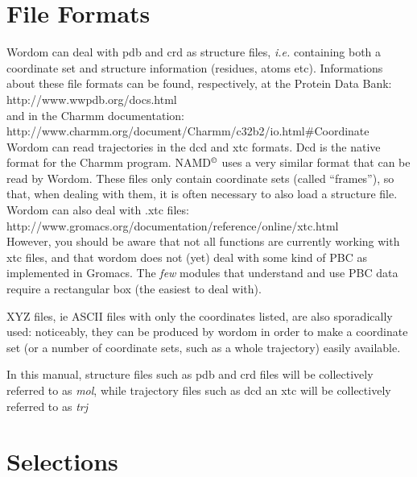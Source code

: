 \documentclass[11pt,twoside,onecolumn,a4paper,openright,notitlepage]{book}[2001/04/21]
\begin{document}
\section{File Formats}
Wordom can deal with pdb and crd as structure files, \emph{i.e.} containing both a coordinate set and structure information (residues, atoms etc). Informations about these file formats can be found, respectively, at the Protein Data Bank:\\ http://www.wwpdb.org/docs.html\\
and in the Charmm documentation:\\ http://www.charmm.org/document/Charmm/c32b2/io.html\#Coordinate\\
Wordom can read trajectories in the dcd and xtc formats. Dcd is the native format for the Charmm program. NAMD$^{\tiny \copyright{}}$ uses a very similar format that can be read by Wordom. These files only contain coordinate sets (called ``frames''), so that, when dealing with them, it is often necessary to also load a structure file.\\
Wordom can also deal with .xtc files:\\
http://www.gromacs.org/documentation/reference/online/xtc.html \\
However, you should be aware that not all functions are currently working with xtc files, and that wordom does not (yet) deal with some kind of PBC as implemented in Gromacs. The \emph{few} modules that understand and use PBC data require a rectangular box (the easiest to deal with).

XYZ files, ie ASCII files with only the coordinates listed, are also sporadically used: noticeably, they can be produced by wordom in order to make a coordinate set (or a number of coordinate sets, such as a whole trajectory) easily available.

In this manual, structure files such as pdb and crd files will be collectively referred to as \emph{mol}, while trajectory files such as dcd an xtc will be collectively referred to as \emph{trj}

\section{Selections}
\end{document}
